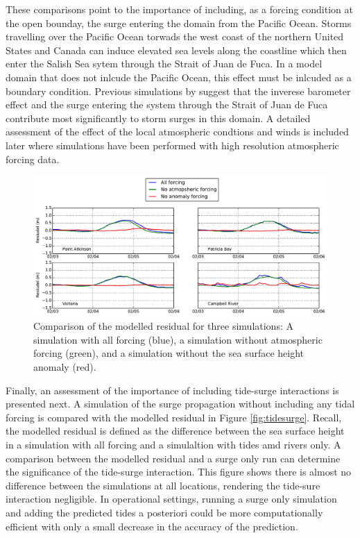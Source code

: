 \documentclass[pdftex,10pt]{article}
\begin{document}
These comparisons point to the importance of including, as a forcing condition at the open bounday, the surge entering the domain from the Pacific Ocean. Storms travelling over the Pacific Ocean torwads the west coast of the northern United States and Canada can induce elevated sea levels along the coastline which then enter the Salish Sea sytem through the Strait of Juan de Fuca. In a model domain that does not inlcude the Pacific Ocean, this effect must be inlcuded as a boundary condition. Previous simulations by \citet{murty1995storm} suggest that the inverese barometer effect and the surge entering the system through the Strait of Juan de Fuca contribute most significantly to storm surges in this domain.  A detailed assessment of the effect of the local atmospheric condtions and winds is included later where simulations have been performed with high resolution atmospheric forcing data.  

\begin{figure}
\centering
\includegraphics[scale=0.6]{Figures/feb2006_factors_bg.pdf}
\caption{Comparison of the modelled residual for three simulations: A simulation with all forcing (blue), a simulation without atmospheric forcing (green), and a simulation without the sea surface height anomaly (red). }
\label{fig:factors}
\end{figure}

Finally, an assessment of the importance of including tide-surge interactions is presented next. A simulation of the surge propagation without including any tidal forcing is compared with the modelled residual in Figure \ref{fig:tidesurge}. Recall, the modelled residual is defined as the difference between the sea surface height in a simulation with all forcing and a simulaltion with tides amd rivers only. A comparison between the modelled residual and a surge only run can determine the significance of the tide-surge interaction. This figure shows there is almost no difference between the simulations at all locations, rendering the tide-sure interaction negligible. In operational settings, running a surge only simulation and adding the predicted tides a posteriori could be more computationally efficient with only a small decrease in the accuracy of the prediction. 
\end{document}
